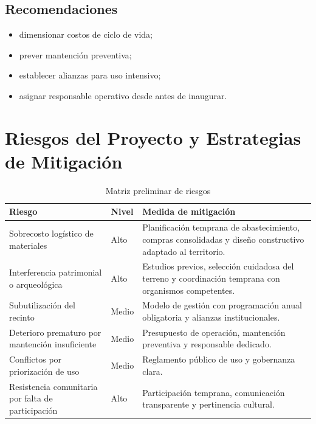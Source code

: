 \documentclass[12pt,letterpaper]{article}
\begin{document}
\subsection{Recomendaciones}

\begin{itemize}
    \item dimensionar costos de ciclo de vida;
    \item prever mantención preventiva;
    \item establecer alianzas para uso intensivo;
    \item asignar responsable operativo desde antes de inaugurar.
\end{itemize}

\section{Riesgos del Proyecto y Estrategias de Mitigación}

\begin{table}[H]
\centering
\caption{Matriz preliminar de riesgos}
\begin{tabularx}{\textwidth}{>{\RaggedRight\arraybackslash}p{4cm}>{\RaggedRight\arraybackslash}p{3cm}X}
\toprule
\textbf{Riesgo} & \textbf{Nivel} & \textbf{Medida de mitigación} \\
\midrule
Sobrecosto logístico de materiales & Alto & Planificación temprana de abastecimiento, compras consolidadas y diseño constructivo adaptado al territorio. \\
Interferencia patrimonial o arqueológica & Alto & Estudios previos, selección cuidadosa del terreno y coordinación temprana con organismos competentes. \\
Subutilización del recinto & Medio & Modelo de gestión con programación anual obligatoria y alianzas institucionales. \\
Deterioro prematuro por mantención insuficiente & Medio & Presupuesto de operación, mantención preventiva y responsable dedicado. \\
Conflictos por priorización de uso & Medio & Reglamento público de uso y gobernanza clara. \\
Resistencia comunitaria por falta de participación & Alto & Participación temprana, comunicación transparente y pertinencia cultural. \\
\bottomrule
\end{tabularx}
\end{table}
\end{document}
